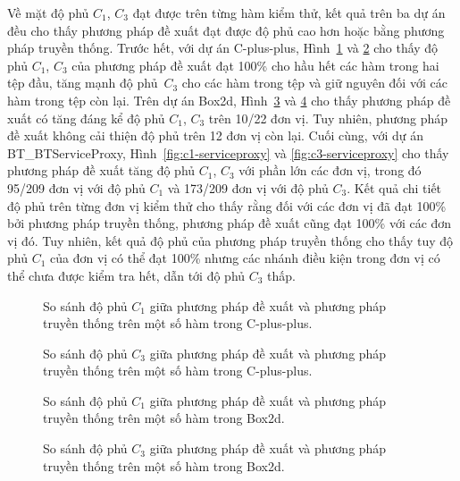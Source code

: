 Về mặt độ phủ $C_1$, $C_3$ đạt được trên từng hàm kiểm thử, kết quả trên ba dự án đều cho thấy phương pháp đề xuất đạt được độ phủ cao hơn hoặc bằng phương pháp truyền thống. Trước hết, với dự án C-plus-plus, Hình~\ref{fig:c1-algo} và \ref{fig:c3-algo} cho thấy độ phủ $C_1$, $C_3$ của phương pháp đề xuất đạt 100\% cho hầu hết các hàm trong hai tệp đầu, tăng mạnh độ phủ~$C_3$ cho các hàm trong tệp  và giữ nguyên đối với các hàm trong tệp còn lại. Trên dự án Box2d, Hình~\ref{fig:c1-box2d} và \ref{fig:c3-box2d} cho thấy phương pháp đề xuất có tăng đáng kể độ phủ $C_1$, $C_3$ trên 10/22 đơn vị. Tuy nhiên, phương pháp đề xuất không cải thiện độ phủ trên 12 đơn vị còn lại. Cuối cùng, với dự án BT\_BTServiceProxy, Hình~\ref{fig:c1-serviceproxy} và \ref{fig:c3-serviceproxy} cho thấy phương pháp đề xuất tăng độ phủ $C_1$, $C_3$ với phần lớn các đơn vị, trong đó 95/209 đơn vị với độ phủ $C_1$ và 173/209 đơn vị với độ phủ $C_3$. Kết quả chi tiết độ phủ trên từng đơn vị kiểm thử cho thấy rằng đối với các đơn vị đã đạt 100\% bởi phương pháp truyền thống, phương pháp đề xuất cũng đạt 100\% với các đơn vị đó. Tuy nhiên, kết quả độ phủ của phương pháp truyền thống cho thấy tuy độ phủ $C_1$ của đơn vị có thể đạt 100\% nhưng các nhánh điều kiện trong đơn vị có thể chưa được kiểm tra hết, dẫn tới độ phủ $C_3$ thấp. 

\begin{figure}[H]
    \centering
    
    \caption{So sánh độ phủ $C_1$ giữa phương pháp đề xuất và phương pháp truyền thống trên một số hàm trong C-plus-plus.}
    \label{fig:c1-algo}
\end{figure}

\begin{figure}[H]
    \centering
    
    \caption{So sánh độ phủ $C_3$ giữa phương pháp đề xuất và phương pháp truyền thống trên một số hàm trong C-plus-plus.}
    \label{fig:c3-algo}
\end{figure}

\begin{figure}[H]
	\centering
	
	\caption{So sánh độ phủ $C_1$ giữa phương pháp đề xuất và phương pháp truyền thống trên một số hàm trong Box2d.}
	\label{fig:c1-box2d}
\end{figure}

\begin{figure}[H]
	\centering
	
	\caption{So sánh độ phủ $C_3$ giữa phương pháp đề xuất và phương pháp truyền thống trên một số hàm trong Box2d.}
	\label{fig:c3-box2d}
\end{figure}

